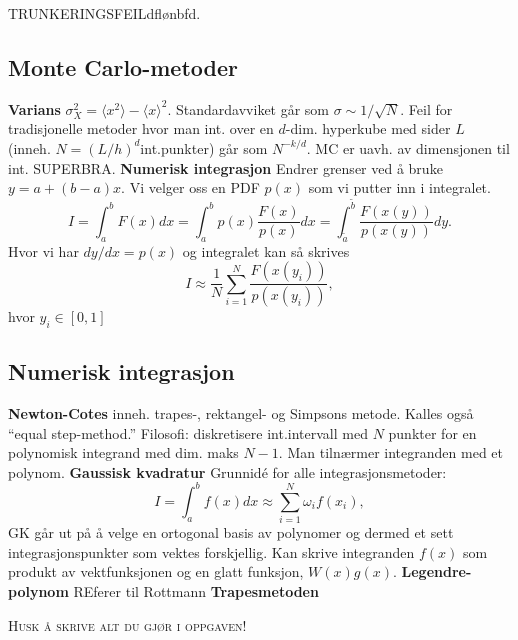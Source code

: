 \documentclass[12pt,a4paper,twocolumn]{article}
\begin{document}
\begin{flushleft}
TRUNKERINGSFEILdflønbfd.

\subsection{Monte Carlo-metoder} %
\label{sub:monte_carlo_metoder}
\textbf{Varians} $\sigma^2_X =  \langle x^2 \rangle - \langle x\rangle^2$. Standardavviket går som $\sigma \sim 1/\sqrt N$. Feil for tradisjonelle metoder hvor man int. over en $d$-dim. hyperkube med sider $L$ (inneh. $N = (L/h)^d$int.punkter) går som $N^{-k/d}$. MC er uavh. av dimensjonen til int. SUPERBRA.
\textbf{Numerisk integrasjon} Endrer grenser ved å bruke $y=a+(b-a)x$. Vi velger oss en PDF $p(x)$ som vi putter inn i integralet.
$$I=\int_a^b F(x) dx =\int_a^b p(x)\frac{F(x)}{p(x)} dx=\int_{\tilde{a}}^{\tilde{b}}\frac{F(x(y))}{p(x(y))} dy.$$
Hvor vi har $dy/dx=p(x)$ og integralet  kan så skrives
$$ I\approx  \frac{1}{N}\sum_{i=1}^N\frac{F(x(y_i))}{p(x(y_i))},$$
hvor $y_i\in[0,1]$

\subsection{Numerisk integrasjon} %
\label{sub:numerisk_integrasjon}
\textbf{Newton-Cotes} inneh. trapes-, rektangel- og Simpsons metode. Kalles også ``equal step-method.'' Filosofi: diskretisere int.intervall med $N$ punkter for en polynomisk integrand med dim. maks $N-1$. Man tilnærmer integranden med et polynom.
\textbf{Gaussisk kvadratur} %
Grunnidé for alle integrasjonsmetoder:
\begin{equation*} 
   I=\int_a^bf(x)dx \approx \sum_{i=1}^N\omega_if(x_i),  
\end{equation*}
GK går ut på å velge en ortogonal basis av polynomer og dermed et sett integrasjonspunkter som vektes forskjellig. Kan skrive integranden $f(x)$ som produkt av vektfunksjonen og en glatt funksjon, $W(x)g(x)$.
\textbf{Legendre-polynom} REferer til Rottmann
\textbf{Trapesmetoden}


\textsc{\large Husk å skrive alt du gjør i oppgaven!}

\end{flushleft}
\end{document}
